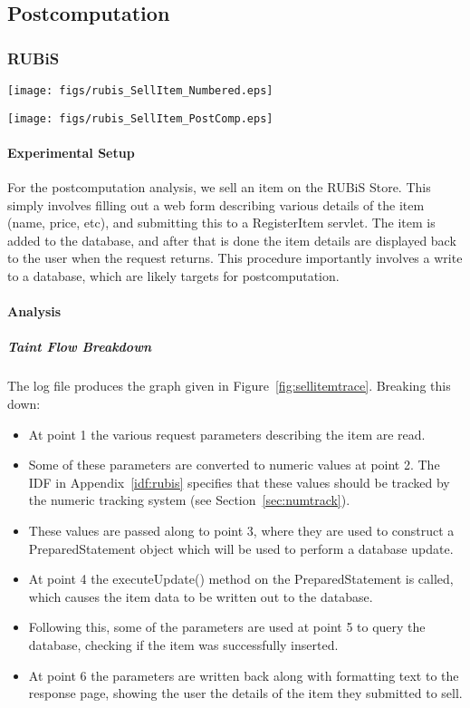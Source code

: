 \documentclass[msc,oneside]{ubcthesis}
\begin{document}
\subsection{Postcomputation}
\label{ana:postcomp}
\subsubsection{RUBiS}

\begin{sidewaysfigure}
\centering
\scalebox{0.44}
{\texttt{[image: figs/rubis\_SellItem\_Numbered.eps]}}
\caption{RUBiS Sell Item Trace} 
\label{fig:sellitemtrace}
\end{sidewaysfigure}

\begin{sidewaysfigure}
\centering
\scalebox{0.44}
{\texttt{[image: figs/rubis\_SellItem\_PostComp.eps]}}
\caption{RUBiS Sell Item Postcomputation Analysis Results} 
\label{fig:sellitempostcomputation}
\end{sidewaysfigure}

\paragraph{Experimental Setup}
For the postcomputation analysis, we sell an item on the RUBiS Store. This simply involves filling out a web form describing various details of the item (name, price, etc), and submitting this to a RegisterItem servlet. The item is added to the database, and after that is done the item details are displayed back to the user when the request returns. This procedure importantly involves a write to a database, which are likely targets for postcomputation.

\paragraph{Analysis}
\subparagraph{Taint Flow Breakdown}
The log file produces the graph given in Figure~\ref{fig:sellitemtrace}. Breaking this down:
\begin{itemize}
\item At point 1 the various request parameters describing the item are read.
\item Some of these parameters are converted to numeric values at point 2. The IDF in Appendix~\ref{idf:rubis} specifies that these values should be tracked by the numeric tracking system (see Section~\ref{sec:numtrack}).
\item These values are passed along to point 3, where they are used to construct a PreparedStatement object which will be used to perform a database update.
\item At point 4 the executeUpdate() method on the PreparedStatement is called, which causes the item data to be written out to the database.
\item Following this, some of the parameters are used at point 5 to query the database, checking if the item was successfully inserted.
\item At point 6 the parameters are written back along with formatting text to the response page, showing the user the details of the item they submitted to sell.
\end{itemize}
\end{document}

